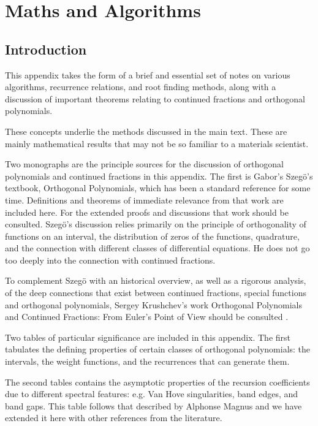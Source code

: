 \chapter{Maths and Algorithms}
\section{Introduction}
This appendix takes the form of a brief and essential
set of notes on various algorithms, recurrence relations, and
root finding methods, along with a discussion of important
theorems relating to continued fractions and orthogonal polynomials. 

These concepts underlie the methods discussed in the main text. 
These are mainly mathematical results
that may not be so familiar to a materials scientist.

Two monographs are the principle sources for the discussion
of orthogonal polynomials and continued fractions in this appendix. 
The first is Gabor's Szeg\"o's textbook,
Orthogonal Polynomials, which has been a standard reference
for some time. Definitions and theorems of immediate relevance 
from that work are included here. For the extended proofs and discussions 
that work should be consulted. Szeg\"o's discussion relies primarily
on the principle of orthogonality of functions on an interval, the distribution
of zeros of the functions, quadrature, and the connection with different
classes of differential equations. He does not go too 
deeply into the connection with continued fractions.

To complement Szeg\"o with an historical overview, as well as
a rigorous analysis, of the deep
connections that exist between continued fractions, 
special functions and orthogonal polynomials, Sergey 
Krushchev's work Orthogonal Polynomials and Continued Fractions: From Euler's Point
of View should be consulted \cite{khrushchev10}. 

Two tables of particular significance are included in this
appendix. The first tabulates 
the defining properties of certain classes of orthogonal polynomials:
the intervals, the weight functions, and the recurrences that can generate
them.

The second tables contains the asymptotic properties 
of the recursion coefficients due to different spectral
features: e.g. Van Hove singularities, band edges, and  band gaps. 
This table follows that described by Alphonse Magnus and we 
have extended it here with other references
from the literature.

